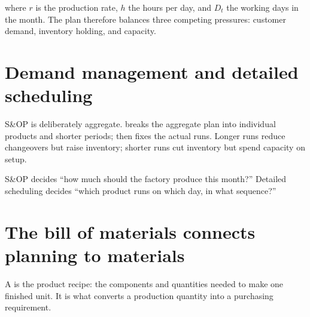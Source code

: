 where $r$ is the production rate, $h$ the hours per day, and $D_t$ the working
days in the month. The plan therefore balances three competing pressures:
customer demand, inventory holding, and capacity.

\section{Demand management and detailed scheduling}

S\&OP is deliberately aggregate.  breaks the aggregate
plan into individual products and shorter periods; 
then fixes the actual runs. Longer runs reduce changeovers but raise inventory;
shorter runs cut inventory but spend capacity on setup.

\begin{intuition}
S\&OP decides ``how much should the factory produce this month?'' Detailed
scheduling decides ``which product runs on which day, in what sequence?''
\end{intuition}

\section{The bill of materials connects planning to materials}

A  is the product recipe: the components and
quantities needed to make one finished unit. It is what converts a production
quantity into a purchasing requirement.

